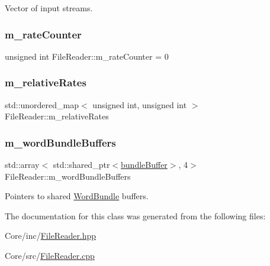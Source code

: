 Vector of input streams. 

\mbox{\label{class_file_reader_a2e6b51dae972af878f7751f2b6a54d75}} 
\subsubsection{\texorpdfstring{m\+\_\+rate\+Counter}{m\_rateCounter}}
{\footnotesize\ttfamily unsigned int File\+Reader\+::m\+\_\+rate\+Counter = 0\hspace{0.3cm}{\ttfamily [private]}}

\mbox{\label{class_file_reader_ab47bb74c4b6d3e038501cc93ec669d33}} 
\subsubsection{\texorpdfstring{m\+\_\+relative\+Rates}{m\_relativeRates}}
{\footnotesize\ttfamily std\+::unordered\+\_\+map$<$ unsigned int, unsigned int $>$ File\+Reader\+::m\+\_\+relative\+Rates\hspace{0.3cm}{\ttfamily [private]}}

\mbox{\label{class_file_reader_a038d1362d7e0458b3450ab8584eab688}} 
\subsubsection{\texorpdfstring{m\+\_\+word\+Bundle\+Buffers}{m\_wordBundleBuffers}}
{\footnotesize\ttfamily std\+::array$<$ std\+::shared\+\_\+ptr$<$\hyperlink{class_file_reader_ac755c1e271610c2c12a7fc5b55cc048b}{bundle\+Buffer}$>$, 4$>$ File\+Reader\+::m\+\_\+word\+Bundle\+Buffers\hspace{0.3cm}{\ttfamily [private]}}



Pointers to shared \hyperlink{class_word_bundle}{Word\+Bundle} buffers. 



The documentation for this class was generated from the following files\+:\begin{DoxyCompactItemize}
\item 
Core/inc/\hyperlink{_file_reader_8hpp}{File\+Reader.\+hpp}\item 
Core/src/\hyperlink{_file_reader_8cpp}{File\+Reader.\+cpp}\end{DoxyCompactItemize}
